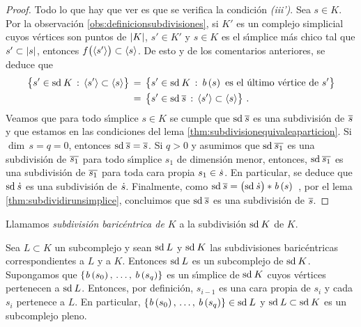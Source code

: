 \begin{proof}
	Todo lo que hay que ver es que se verifica la condici\'{o}n
	\emph{(iii')}. Sea $s\in K$. Por la observaci\'{o}n
	\ref{obs:definicionsubdivisiones}, si $K'$ es un complejo
	simplicial cuyos v\'{e}rtices son puntos de $\left|K\right|$, $s'\in K'$
	y $s\in K$ es el s\'{\i}mplice m\'{a}s chico tal que
	$s'\subset\left|s\right|$, entonces
	$f\big(\langle s'\rangle\big)\subset\langle s\rangle$. De esto y
	de los comentarios anteriores, se deduce que
	\begin{align*}
		\big\{s'\in\mathrm{sd}^{}\,K\,:\,
			\langle s'\rangle\subset\langle s\rangle\big\} & \,=\,
			\big\{s'\in\mathrm{sd}^{}\,K\,:\,\mathit{b}\left(s\right)
				\text{ es el \'{u}ltimo v\'{e}rtice de } s'
				\big\} \\
		& \,=\,\big\{s'\in\mathrm{sd}^{}\,\overline{s}\,:\,
			\langle s'\rangle\subset\langle s\rangle\big\}
		\text{ .}
	\end{align*}
	Veamos que para todo s\'{\i}mplice $s\in K$ se cumple que
	$\mathrm{sd}^{}\,\overline{s}$ es una subdivisi\'{o}n de $\overline{s}$ y que
	estamos en las condiciones del lema
	\ref{thm:subdivisionequivaleaparticion}. Si $\dim\,s=q=0$, entonces
	$\mathrm{sd}^{}\,\overline{s}=\overline{s}$. Si $q>0$ y asumimos que
	$\mathrm{sd}^{}\,\overline{s_{1}}$ es una subdivisi\'{o}n de $\overline{s_{1}}$
	para todo s\'{\i}mplice $s_{1}$ de dimensi\'{o}n menor, entonces,
	$\mathrm{sd}^{}\,\overline{s_{1}}$ es una subdivisi\'{o}n de $\overline{s_{1}}$
	para toda cara propia $s_{1}\in\dot{s}$. En particular, se deduce
	que $\mathrm{sd}^{}\,\dot{s}$ es una subdivisi\'{o}n de $\dot{s}$.
	Finalmente, como
	\begin{math}
		\mathrm{sd}^{}\,\overline{s}=\big(\mathrm{sd}^{}\,\dot{s}\big)*\mathit{b}\left(s\right)
	\end{math}~,
	por el lema \ref{thm:subdividirunsimplice}, concluimos que
	$\mathrm{sd}^{}\,\overline{s}$ es una subdivisi\'{o}n de $\overline{s}$.
\end{proof}

Llamamos \emph{subdivisi\'{o}n baric\'{e}ntrica de $K$} a la subdivisi\'{o}n
$\mathrm{sd}^{}\,K$ de $K$.

\begin{obsBaricentricaDeSubcomplejoEsPlena}%
	\label{obs:baricentricadesubcomplejoesplena}
	Sea $L\subset K$ un subcomplejo y sean $\mathrm{sd}^{}\,L$ y $\mathrm{sd}^{}\,K$ las
	subdivisiones baric\'{e}ntricas correspondientes a $L$ y a $K$.
	Entonces $\mathrm{sd}^{}\,L$ es un subcomplejo de $\mathrm{sd}^{}\,K$. Supongamos que
	$\{\mathit{b}\left(s_{0}\right),\,\dots,\,\mathit{b}\left(s_{q}\right)\}$ es un s\'{\i}mplice de
	$\mathrm{sd}^{}\,K$ cuyos v\'{e}rtices pertenecen a $\mathrm{sd}^{}\,L$. Entonces,
	por definici\'{o}n, $s_{i-1}$ es una cara propia de $s_{i}$ y cada
	$s_{i}$ pertenece a $L$. En particular,
	$\{\mathit{b}\left(s_{0}\right),\,\dots,\,\mathit{b}\left(s_{q}\right)\}\in\mathrm{sd}^{}\,L$ y
	$\mathrm{sd}^{}\,L\subset\mathrm{sd}^{}\,K$ es un subcomplejo pleno.
\end{obsBaricentricaDeSubcomplejoEsPlena}

